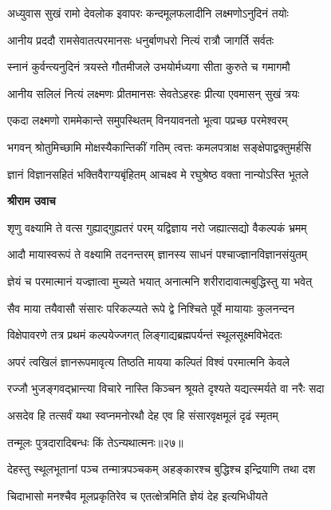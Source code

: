 \twolineshloka
{अध्युवास सुखं रामो देवलोक इवापरः}
{कन्दमूलफलादीनि लक्ष्मणोऽनुदिनं तयोः} %

\twolineshloka
{आनीय प्रददौ रामसेवातत्परमानसः}
{धनुर्बाणधरो नित्यं रात्रौ जागर्ति सर्वतः} %

\twolineshloka
{स्नानं कुर्वन्त्यनुदिनं त्रयस्ते गौतमीजले}
{उभयोर्मध्यगा सीता कुरुते च गमागमौ} %

\twolineshloka
{आनीय सलिलं नित्यं लक्ष्मणः प्रीतमानसः}
{सेवतेऽहरहः प्रीत्या एवमासन् सुखं त्रयः} %

\twolineshloka
{एकदा लक्ष्मणो राममेकान्ते समुपस्थितम्}
{विनयावनतो भूत्वा पप्रच्छ परमेश्वरम्} %

\twolineshloka
{भगवन् श्रोतुमिच्छामि मोक्षस्यैकान्तिकीं गतिम्}
{त्वत्तः कमलपत्राक्ष सङ्क्षेपाद्वक्तुमर्हसि} %

\twolineshloka
{ज्ञानं विज्ञानसहितं भक्तिवैराग्यबृंहितम्}
{आचक्ष्व मे रघुश्रेष्ठ वक्ता नान्योऽस्ति भूतले} %

\textbf{श्रीराम उवाच}

\twolineshloka
{शृणु वक्ष्यामि ते वत्स गुह्याद्गुह्यतरं परम्}
{यद्विज्ञाय नरो जह्यात्सद्यो वैकल्पकं भ्रमम्} %

\twolineshloka
{आदौ मायास्वरूपं ते वक्ष्यामि तदनन्तरम्}
{ज्ञानस्य साधनं पश्चाज्ज्ञानविज्ञानसंयुतम्} %

\twolineshloka
{ज्ञेयं च परमात्मानं यज्ज्ञात्वा मुच्यते भयात्}
{अनात्मनि शरीरादावात्मबुद्धिस्तु या भवेत्} %

\twolineshloka
{सैव माया तयैवासौ संसारः परिकल्प्यते}
{रूपे द्वे निश्चिते पूर्वे मायायाः कुलनन्दन} %

\twolineshloka
{विक्षेपावरणे तत्र प्रथमं कल्पयेज्जगत्}
{लिङ्गाद्यब्रह्मपर्यन्तं स्थूलसूक्ष्मविभेदतः} %

\twolineshloka
{अपरं त्वखिलं ज्ञानरूपमावृत्य तिष्ठति}
{मायया कल्पितं विश्वं परमात्मनि केवले} %

\twolineshloka
{रज्जौ भुजङ्गवद्भ्रान्त्या विचारे नास्ति किञ्चन}
{श्रूयते दृश्यते यद्यत्स्मर्यते वा नरैः सदा} %

\twolineshloka
{असदेव हि तत्सर्वं यथा स्वप्नमनोरथौ}
{देह एव हि संसारवृक्षमूलं दृढं स्मृतम्} %

{तन्मूलः पुत्रदारादिबन्धः किं तेऽन्यथात्मनः॥२७॥} %


\twolineshloka
{देहस्तु स्थूलभूतानां पञ्च तन्मात्रपञ्चकम्}
{अहङ्कारश्च बुद्धिश्च इन्द्रियाणि तथा दश} %

\twolineshloka
{चिदाभासो मनश्चैव मूलप्रकृतिरेव च}
{एतत्क्षेत्रमिति ज्ञेयं देह इत्यभिधीयते} %

